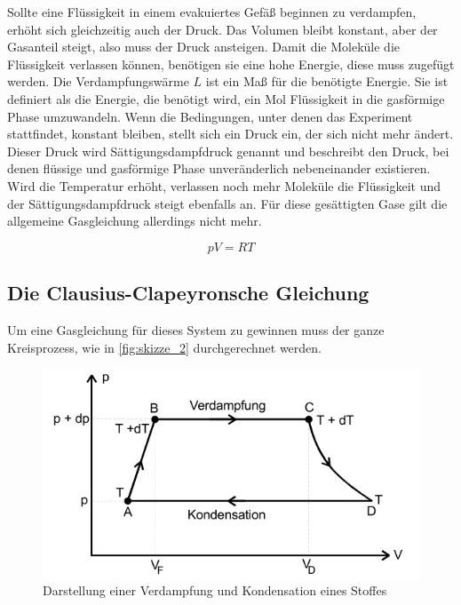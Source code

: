 Sollte eine Flüssigkeit in einem evakuiertes Gefäß beginnen zu verdampfen, erhöht sich gleichzeitig auch der Druck. Das Volumen bleibt konstant, aber der Gasanteil steigt, also muss der Druck ansteigen.
Damit die Moleküle die Flüssigkeit verlassen können, benötigen sie eine hohe Energie, diese muss zugefügt werden.
Die Verdampfungswärme $L$ ist ein Maß für die benötigte Energie.
Sie ist definiert als die Energie, die benötigt wird, ein Mol Flüssigkeit in die gasförmige Phase umzuwandeln.
Wenn die Bedingungen, unter denen das Experiment stattfindet, konstant bleiben, stellt sich ein Druck ein, der sich nicht mehr ändert.
Dieser Druck wird Sättigungsdampfdruck genannt und beschreibt den Druck, bei denen flüssige und gasförmige Phase unveränderlich nebeneinander existieren.
Wird die Temperatur erhöht, verlassen noch mehr Moleküle die Flüssigkeit und der Sättigungsdampfdruck steigt ebenfalls an.
Für diese gesättigten Gase gilt die allgemeine Gasgleichung allerdings nicht mehr.

\begin{equation}
    pV = RT
    \label{eq:gas:gl}
\end{equation}

\subsection{Die Clausius-Clapeyronsche Gleichung}
\label{ssec:b}

Um eine Gasgleichung für dieses System zu gewinnen muss der ganze Kreisprozess, wie in \autoref{fig:skizze_2} durchgerechnet werden.

\begin{figure}
    \centering
    \includegraphics[width=\textwidth/2]{images/bild2.png}
    \caption{Darstellung einer Verdampfung und Kondensation eines Stoffes \cite{V203}}
    \label{fig:skizze_2}
\end{figure}

